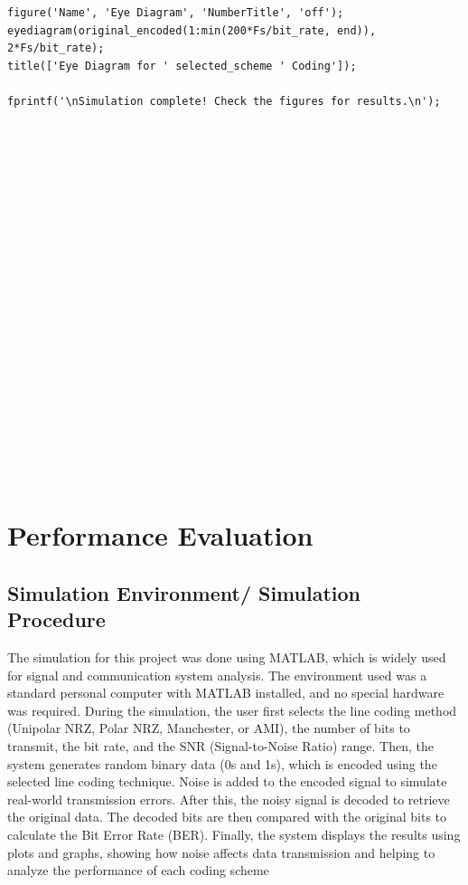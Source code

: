 \documentclass[12pt]{report}
\begin{document}
\begin{lstlisting}[style=matlabStyle, caption={}]
% 3. Eye Diagram
figure('Name', 'Eye Diagram', 'NumberTitle', 'off');
eyediagram(original_encoded(1:min(200*Fs/bit_rate, end)), 2*Fs/bit_rate);
title(['Eye Diagram for ' selected_scheme ' Coding']);

fprintf('\nSimulation complete! Check the figures for results.\n');

  
    
  
    
    
    
   
  
    
    
  
    
 
    
 
   
   
   
   
   
\end{lstlisting}


\newpage
\chapter{Performance Evaluation}

\section{Simulation Environment/ Simulation Procedure}
\begin{itemize}
     
The simulation for this project was done using MATLAB, which is widely used for signal and communication system analysis. The environment used was a standard personal computer with MATLAB installed, and no special hardware was required. During the simulation, the user first selects the line coding method (Unipolar NRZ, Polar NRZ, Manchester, or AMI), the number of bits to transmit, the bit rate, and the SNR (Signal-to-Noise Ratio) range. Then, the system generates random binary data (0s and 1s), which is encoded using the selected line coding technique. Noise is added to the encoded signal to simulate real-world transmission errors. After this, the noisy signal is decoded to retrieve the original data. The decoded bits are then compared with the original bits to calculate the Bit Error Rate (BER). Finally, the system displays the results using plots and graphs, showing how noise affects data transmission and helping to analyze the performance of each coding scheme
\end{itemize}
\end{document}
